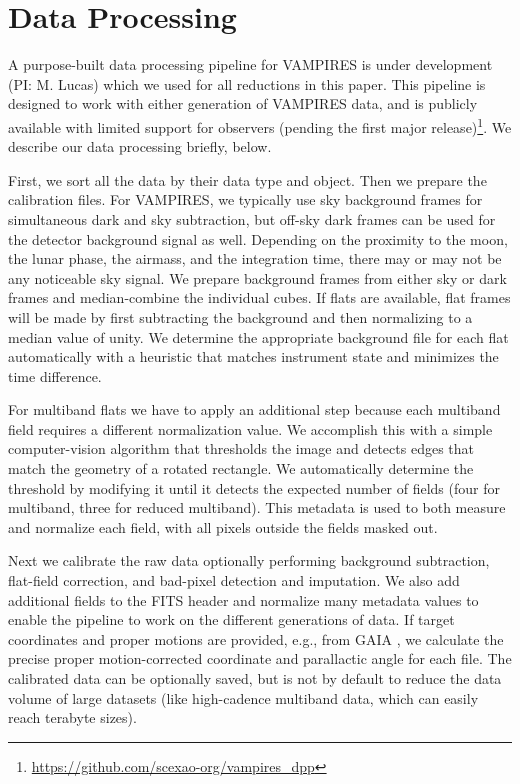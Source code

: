 \section{Data Processing}\label{sec:processing}

A purpose-built data processing pipeline for VAMPIRES is under development (PI: M. Lucas) which we used for all reductions in this paper. This pipeline is designed to work with either generation of VAMPIRES data, and is publicly available with limited support for observers (pending the first major release)\footnote{\url{https://github.com/scexao-org/vampires_dpp}}. We describe our data processing briefly, below.

First, we sort all the data by their data type and object. Then we prepare the calibration files. For VAMPIRES, we typically use sky background frames for simultaneous dark and sky subtraction, but off-sky dark frames can be used for the detector background signal as well. Depending on the proximity to the moon, the lunar phase, the airmass, and the integration time, there may or may not be any noticeable sky signal. We prepare background frames from either sky or dark frames and median-combine the individual cubes. If flats are available, flat frames will be made by first subtracting the background and then normalizing to a median value of unity. We determine the appropriate background file for each flat automatically with a heuristic that matches instrument state and minimizes the time difference.

For multiband flats we have to apply an additional step because each multiband field requires a different normalization value. We accomplish this with a simple computer-vision algorithm that thresholds the image and detects edges that match the geometry of a rotated rectangle. We automatically determine the threshold by modifying it until it detects the expected number of fields (four for multiband, three for reduced multiband). This metadata is used to both measure and normalize each field, with all pixels outside the fields masked out.

Next we calibrate the raw data optionally performing background subtraction, flat-field correction, and bad-pixel detection and imputation. We also add additional fields to the FITS header and normalize many metadata values to enable the pipeline to work on the different generations of data. If target coordinates and proper motions are provided, e.g., from GAIA \citep{gaia_collaboration_gaia_2016,gaia_collaboration_gaia_2018,gaia_collaboration_gaia_2021}, we calculate the precise proper motion-corrected coordinate and parallactic angle for each file. The calibrated data can be optionally saved, but is not by default to reduce the data volume of large datasets (like high-cadence multiband data, which can easily reach terabyte sizes).

